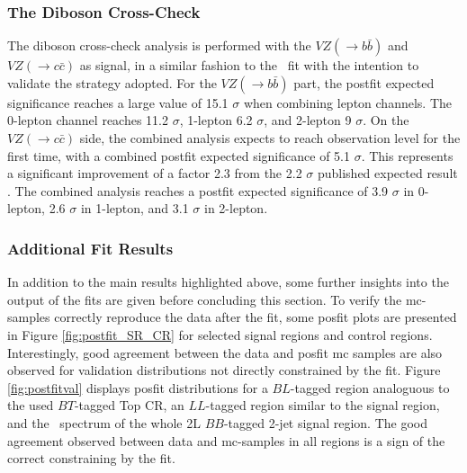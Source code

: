 \subsubsection{The Diboson Cross-Check}\label{subsec-DibosonC}
The diboson cross-check analysis is performed with the $VZ (\rightarrow b\bar{b})$ and $VZ (\rightarrow c\bar{c})$ as signal, in a similar fashion to the \vhbc\ fit with the intention to validate the strategy adopted. For the $VZ (\rightarrow b\bar{b})$ part, the postfit expected significance reaches a large value of 15.1 $\sigma$ when combining lepton channels. The 0-lepton channel reaches 11.2 $\sigma$, 1-lepton 6.2 $\sigma$, and 2-lepton 9 $\sigma$. On the $VZ (\rightarrow c\bar{c})$ side, the combined analysis expects to reach observation level for the first time, with a combined postfit expected significance of 5.1 $\sigma$. This represents a significant improvement of a factor 2.3 from the 2.2 $\sigma$ published expected result \cite{Collaboration:2721696}. The combined analysis reaches a postfit expected significance of 3.9 $\sigma$ in 0-lepton, 2.6 $\sigma$ in 1-lepton, and 3.1 $\sigma$ in 2-lepton.

\subsubsection{Additional Fit Results}
In addition to the main results highlighted above, some further insights into the output of the fits are given before concluding this section. To verify the \gls{mc}-samples correctly reproduce the data after the fit, some posfit plots are presented in Figure \ref{fig:postfit_SR_CR} for selected signal regions and control regions. Interestingly, good agreement between the data and posfit \gls{mc} samples are also observed for validation distributions not directly constrained by the fit. Figure \ref{fig:postfitval} displays posfit distributions for a $BL$-tagged region analoguous to the used $BT$-tagged Top CR, an $LL$-tagged region similar to the signal region, and the \ptv\ spectrum of the whole 2L $BB$-tagged 2-jet signal region. The good agreement observed between data and \gls{mc}-samples in all regions is a sign of the correct constraining by the fit. \\

